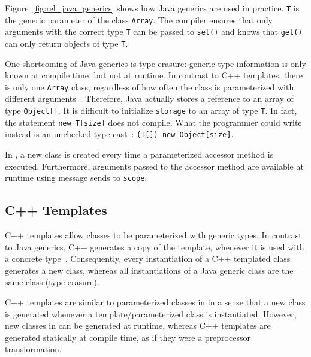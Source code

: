 Figure~\ref{fig:rel_java_generics} shows how Java generics are used in practice. \texttt{T} is the generic parameter of the class \texttt{Array}. The compiler ensures that only arguments with the correct type \texttt{T} can be passed to \texttt{set()} and knows that \texttt{get()} can only return objects of type \texttt{T}. 

One shortcoming of Java generics is type erasure: generic type information is only known at compile time, but not at runtime. In contrast to C++ templates, there is only one \texttt{Array} class, regardless of how often the class is parameterized with different arguments~\cite{lembcke2006specialization}. Therefore, Java actually stores a reference to an array of type \texttt{Object[]}. It is difficult to initialize \texttt{storage} to an array of type \texttt{T}. In fact, the statement \texttt{new T[size]} does not compile. What the programmer could write instead is an unchecked type cast~\cite{nino2007cost}: \texttt{(T[]) new Object[size]}.

In \msname, a new class is created every time a parameterized accessor method is executed. Furthermore, arguments passed to the accessor method are available at runtime using message sends to \texttt{scope}.

\subsection{C++ Templates}
C++ templates allow classes to be parameterized with generic types. In contrast to Java generics, C++ generates a copy of the template, whenever it is used with a concrete type~\cite{vandevoorde2002cpp}. Consequently, every instantiation of a C++ templated class generates a new class, whereas all instantiations of a Java generic class are the same class (type erasure).

C++ templates are similar to parameterized classes in \msname in a sense that a new class is generated whenever a template/parameterized class is instantiated. However, new classes in \msname can be generated at runtime, whereas C++ templates are generated statically at compile time, as if they were a preprocessor transformation.
